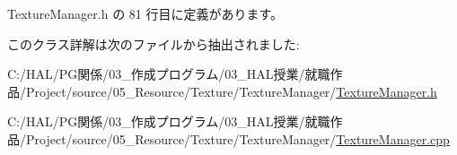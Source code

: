  Texture\+Manager.\+h の 81 行目に定義があります。



このクラス詳解は次のファイルから抽出されました\+:\begin{DoxyCompactItemize}
\item 
C\+:/\+H\+A\+L/\+P\+G関係/03\+\_\+作成プログラム/03\+\_\+\+H\+A\+L授業/就職作品/\+Project/source/05\+\_\+\+Resource/\+Texture/\+Texture\+Manager/\mbox{\hyperlink{_texture_manager_8h}{Texture\+Manager.\+h}}\item 
C\+:/\+H\+A\+L/\+P\+G関係/03\+\_\+作成プログラム/03\+\_\+\+H\+A\+L授業/就職作品/\+Project/source/05\+\_\+\+Resource/\+Texture/\+Texture\+Manager/\mbox{\hyperlink{_texture_manager_8cpp}{Texture\+Manager.\+cpp}}\end{DoxyCompactItemize}
